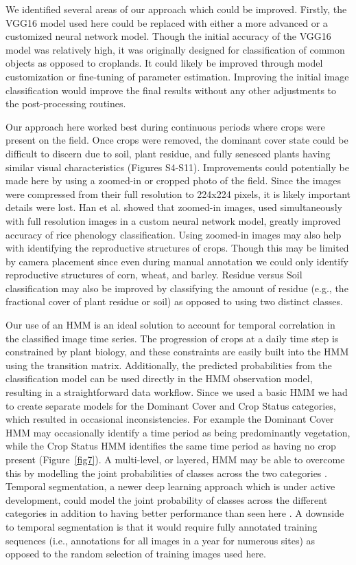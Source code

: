 \documentclass[remotesensing,article,submit,moreauthors,pdftex]{Definitions/mdpi}
\begin{document}
We identified several areas of our approach which could be improved. Firstly, the VGG16 model used here could be replaced with either a more advanced or a customized neural network model. Though the initial accuracy of the VGG16 model was relatively high, it was originally designed for classification of common objects as opposed to croplands. It could likely be improved through model customization or fine-tuning of parameter estimation. Improving the initial image classification would improve the final results without any other adjustments to the post-processing routines. 

Our approach here worked best during continuous periods where crops were present on the field. Once crops were removed, the dominant cover state could be difficult to discern due to soil, plant residue, and fully senesced plants having similar visual characteristics (Figures S4-S11). Improvements could potentially be made here by using a zoomed-in or cropped photo of the field. Since the images were compressed from their full resolution to 224x224 pixels, it is likely important details were lost. Han et al. \citeyear{han-shi2021} showed that zoomed-in images, used simultaneously with full resolution images in a custom neural network model, greatly improved accuracy of rice phenology classification. Using zoomed-in images may also help with identifying the reproductive structures of crops. Though this may be limited by camera placement since even during manual annotation we could only identify reproductive structures of corn, wheat, and barley. Residue versus Soil classification may also be improved by classifying the amount of residue (e.g., the fractional cover of plant residue or soil) as opposed to using two distinct classes. 

Our use of an HMM is an ideal solution to account for temporal correlation in the classified image time series. The progression of crops at a daily time step is constrained by plant biology, and these constraints are easily built into the HMM using the transition matrix. Additionally, the predicted probabilities from the classification model can be used directly in the HMM observation model, resulting in a straightforward data workflow. Since we used a basic HMM we had to create separate models for the Dominant Cover and Crop Status categories, which resulted in occasional inconsistencies. For example the Dominant Cover HMM may occasionally identify a time period as being predominantly vegetation, while the Crop Status HMM identifies the same time period as having no crop present (Figure~\ref{fig7}). A multi-level, or layered, HMM may be able to overcome this by modelling the joint probabilities of classes across the two categories \citep{fine1998}. Temporal segmentation, a newer deep learning approach which is under active development, could model the joint probability of classes across the different categories in addition to having better performance than seen here \citep{lea2016}. A downside to temporal segmentation is that it would require fully annotated training sequences (i.e., annotations for all images in a year for numerous sites) as opposed to the random selection of training images used here. 
\end{document}
